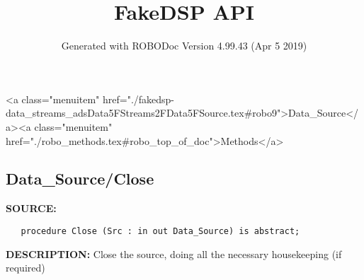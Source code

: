 \documentclass{article}
\title{FakeDSP API}
\author{Generated with ROBODoc Version 4.99.43 (Apr  5 2019)
}
\begin{document}
\maketitle
\printindex
\tableofcontents
\newpage

<a class="menuitem" href="./fakedsp-data_streams_adsData5FStreams2FData5FSource.tex#robo9">Data_Source</a><a class="menuitem" href="./robo_methods.tex#robo_top_of_doc">Methods</a>\subsection{Data\_Source/Close}
\textbf{SOURCE:}\hspace{0.08in}\begin{verbatim}
   procedure Close (Src : in out Data_Source) is abstract;
\end{verbatim}
\textbf{DESCRIPTION:}\hspace{0.08in}
  Close the source, doing all the necessary housekeeping (if required)
\end{document}
